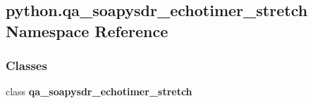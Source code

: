 \subsection{python.\+qa\+\_\+soapysdr\+\_\+echotimer\+\_\+stretch Namespace Reference}
\label{namespacepython_1_1qa__soapysdr__echotimer__stretch}
\subsubsection*{Classes}
\begin{DoxyCompactItemize}
\item 
class {\bf qa\+\_\+soapysdr\+\_\+echotimer\+\_\+stretch}
\end{DoxyCompactItemize}
